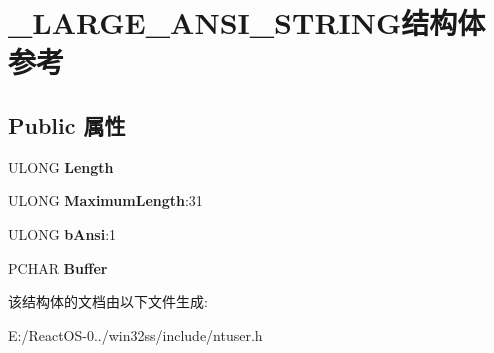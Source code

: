 \hypertarget{struct___l_a_r_g_e___a_n_s_i___s_t_r_i_n_g}{}\section{\+\_\+\+L\+A\+R\+G\+E\+\_\+\+A\+N\+S\+I\+\_\+\+S\+T\+R\+I\+N\+G结构体 参考}
\label{struct___l_a_r_g_e___a_n_s_i___s_t_r_i_n_g}
\subsection*{Public 属性}
\begin{DoxyCompactItemize}
\item 
\mbox{\label{struct___l_a_r_g_e___a_n_s_i___s_t_r_i_n_g_a6f6da0832617aa0774dbc7ced3256c6a}} 
U\+L\+O\+NG {\bfseries Length}
\item 
\mbox{\label{struct___l_a_r_g_e___a_n_s_i___s_t_r_i_n_g_ac7a558a39014a48b13b34cb7ee03f0d8}} 
U\+L\+O\+NG {\bfseries Maximum\+Length}\+:31
\item 
\mbox{\label{struct___l_a_r_g_e___a_n_s_i___s_t_r_i_n_g_a8b02d66e54160291d6e7a996d286da41}} 
U\+L\+O\+NG {\bfseries b\+Ansi}\+:1
\item 
\mbox{\label{struct___l_a_r_g_e___a_n_s_i___s_t_r_i_n_g_a45d515e5da278fd019d4bcd3af2e254c}} 
P\+C\+H\+AR {\bfseries Buffer}
\end{DoxyCompactItemize}


该结构体的文档由以下文件生成\+:\begin{DoxyCompactItemize}
\item 
E\+:/\+React\+O\+S-\/0../win32ss/include/ntuser.\+h\end{DoxyCompactItemize}
